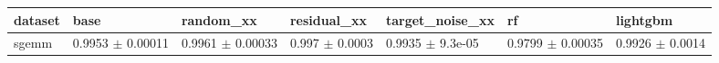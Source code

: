 \begin{tabular}{lllllll}
\toprule
dataset & base & random\_xx & residual\_xx & target\_noise\_xx & rf & lightgbm \\
\midrule
sgemm & 0.9953 $\pm$ 0.00011 & 0.9961 $\pm$ 0.00033 & 0.997 $\pm$ 0.0003 & 0.9935 $\pm$ 9.3e-05 & 0.9799 $\pm$ 0.00035 & 0.9926 $\pm$ 0.0014 \\
\bottomrule
\end{tabular}
